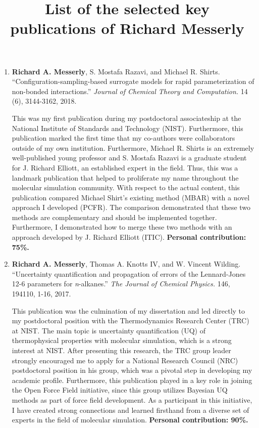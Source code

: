 \documentclass[12pt]{article}
\title{List of the selected key publications of Richard Messerly}
\date{}
\begin{document}
\maketitle


\begin{enumerate}
	
\item \textbf{Richard A. Messerly}, S. Mostafa Razavi, and Michael R. Shirts. ``Configuration-sampling-based surrogate models for rapid parameterization of non-bonded interactions.'' \textit{Journal of Chemical Theory and Computation.} 14 (6), 3144-3162, 2018.

This was my first publication during my postdoctoral associateship at the National Institute of Standards and Technology (NIST). Furthermore, this publication marked the first time that my co-authors were collaborators outside of my own institution. Furthermore, Michael R. Shirts is an extremely well-published young professor and S. Mostafa Razavi is a graduate student for J. Richard Elliott, an established expert in the field. Thus, this was a landmark publication that helped to proliferate my name throughout the molecular simulation community. With respect to the actual content, this publication compared Michael Shirt's existing method (MBAR) with a novel approach I developed (PCFR). The comparison demonstrated that these two methods are complementary and should be implemented together. Furthermore, I demonstrated how to merge these two methods with an approach developed by J. Richard Elliott (ITIC). \textbf{Personal contribution: 75\%.}

\item \textbf{Richard A. Messerly}, Thomas A. Knotts IV, and W. Vincent Wilding. ``Uncertainty quantification and propagation of errors of the Lennard-Jones 12-6 parameters for \textit{n}-alkanes.'' \textit{The Journal of Chemical Physics.} 146, 194110, 1-16, 2017.

This publication was the culmination of my dissertation and led directly to my postdoctoral position with the Thermodynamics Research Center (TRC) at NIST. The main topic is uncertainty quantification (UQ) of thermophysical properties with molecular simulation, which is a strong interest at NIST. After presenting this research, the TRC group leader strongly encouraged me to apply for a National Research Council (NRC) postdoctoral position in his group, which was a pivotal step in developing my academic profile. Furthermore, this publication played in a key role in joining the Open Force Field initiative, since this group utilizes Bayesian UQ methods as part of force field development. As a participant in this initiative, I have created strong connections and learned firsthand from a diverse set of experts in the field of molecular simulation. \textbf{Personal contribution: 90\%.}


\end{enumerate}
\end{document}

